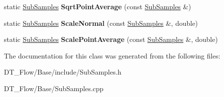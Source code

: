 \begin{DoxyCompactItemize}
static \mbox{\hyperlink{classQn_1_1SubSamples}{Sub\+Samples}} {\bfseries Sqrt\+Point\+Average} (const \mbox{\hyperlink{classQn_1_1SubSamples}{Sub\+Samples}} \&)
\item 
\mbox{\label{classQn_1_1SubSamples_ab7607e5c61a61e7b934ea13b7226cc85}} 
static \mbox{\hyperlink{classQn_1_1SubSamples}{Sub\+Samples}} {\bfseries Scale\+Normal} (const \mbox{\hyperlink{classQn_1_1SubSamples}{Sub\+Samples}} \&, double)
\item 
\mbox{\label{classQn_1_1SubSamples_a270275ad451611bb72b56b9080ab5fff}} 
static \mbox{\hyperlink{classQn_1_1SubSamples}{Sub\+Samples}} {\bfseries Scale\+Point\+Average} (const \mbox{\hyperlink{classQn_1_1SubSamples}{Sub\+Samples}} \&, double)
\end{DoxyCompactItemize}


The documentation for this class was generated from the following files\+:\begin{DoxyCompactItemize}
\item 
D\+T\+\_\+\+Flow/\+Base/include/Sub\+Samples.\+h\item 
D\+T\+\_\+\+Flow/\+Base/Sub\+Samples.\+cpp\end{DoxyCompactItemize}
